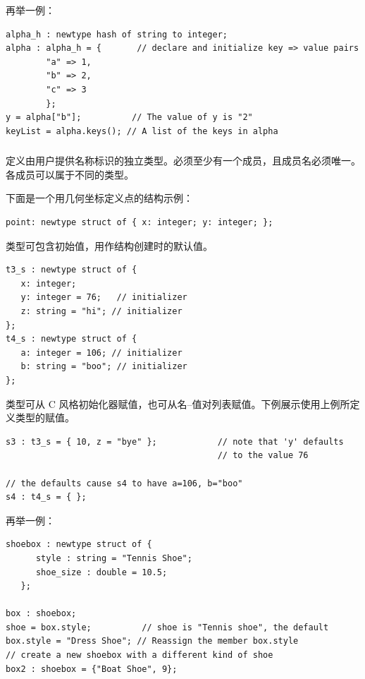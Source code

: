 再举一例：
\begin{lstlisting}[style=pxl]
alpha_h : newtype hash of string to integer;
alpha : alpha_h = {       // declare and initialize key => value pairs
        "a" => 1,
        "b" => 2,
        "c" => 3
        };
y = alpha["b"];          // The value of y is "2"
keyList = alpha.keys(); // A list of the keys in alpha
\end{lstlisting}

\subsubsection{}

定义由用户提供名称标识的独立类型。必须至少有一个成员，且成员名必须唯一。各成员可以属于不同的类型。

下面是一个用几何坐标定义点的结构示例：
\begin{lstlisting}[style=pxl]
point: newtype struct of { x: integer; y: integer; };
\end{lstlisting}

 类型可包含初始值，用作结构创建时的默认值。
\begin{lstlisting}[style=pxl]
t3_s : newtype struct of {
   x: integer;
   y: integer = 76;   // initializer
   z: string = "hi"; // initializer
};
t4_s : newtype struct of {
   a: integer = 106; // initializer
   b: string = "boo"; // initializer
};
\end{lstlisting}

 类型可从 C 风格初始化器赋值，也可从名--值对列表赋值。下例展示使用上例所定义类型的赋值。
\begin{lstlisting}[style=pxl]
s3 : t3_s = { 10, z = "bye" };            // note that 'y' defaults
                                          // to the value 76

// the defaults cause s4 to have a=106, b="boo"
s4 : t4_s = { };
\end{lstlisting}

再举一例：
\begin{lstlisting}[style=pxl]
shoebox : newtype struct of {
      style : string = "Tennis Shoe";
      shoe_size : double = 10.5;
   };

box : shoebox;
shoe = box.style;          // shoe is "Tennis shoe", the default
box.style = "Dress Shoe"; // Reassign the member box.style
// create a new shoebox with a different kind of shoe
box2 : shoebox = {"Boat Shoe", 9};
\end{lstlisting}

